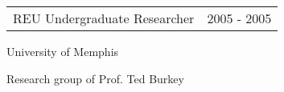 \documentclass[10pt]{article}
\newenvironment{outerlist}[1][\enskip\textbullet]%
        {\begin{itemize}[#1]}{\end{itemize}%
         \vspace{-.6\baselineskip}}
\newenvironment{innerlist}[1][\enskip\textbullet]%
        {\begin{compactitem}[#1]}{\end{compactitem}}
\newcommand{\blankline}{\quad\pagebreak[2]}
\begin{document}
\begin{tabular}{p{240pt} l}
REU Undergraduate Researcher  & 2005 - 2005
\end{tabular}
\begin{innerlist}
\item[\hspace*{20pt}] University of Memphis
\item[\hspace*{20pt}] Research group of Prof. Ted Burkey\\
\end{innerlist}


\blankline

\end{document}
